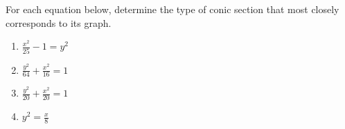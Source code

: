\documentclass{ximera}
\author{Kenneth Berglund}
\begin{document}
For each equation below, determine the type of conic section that most closely corresponds to its graph.
\begin{exercise}
\begin{enumerate}
	\item $\frac{x^2}{25} - 1 = y^2$
\begin{multipleChoice}  
\end{multipleChoice}  

	\item $\frac{y^2}{64} + \frac{x^2}{16} = 1$
\begin{multipleChoice}  
\end{multipleChoice}  

	\item $\frac{y^2}{20} + \frac{x^2}{20} = 1$
\begin{multipleChoice}  
\end{multipleChoice}  

	\item $y^2 = \frac{x}{8}$
\begin{multipleChoice}  
\end{multipleChoice}  

\end{enumerate}





\end{exercise}
\end{document}

